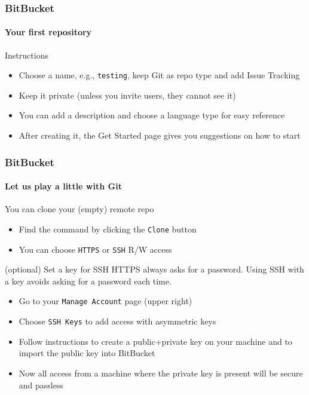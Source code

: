 \begin{frame}
\frametitle{BitBucket}
\framesubtitle{Your first repository}

\begin{block}{Instructions}
\begin{itemize}
\item Choose a name, e.g., \texttt{testing}, keep Git as repo type and add Issue Tracking
\item Keep it private (unless you invite users, they cannot see it)
\item You can add a description and choose a language type for easy reference
\item After creating it, the Get Started page gives you suggestions on how to start
\end{itemize}
\end{block}

\end{frame}

\begin{frame}
\frametitle{BitBucket}
\framesubtitle{Let us play a little with Git}

\begin{block}{You can clone your (empty) remote repo}
\begin{itemize}
\item Find the command by clicking the \texttt{Clone} button
\item You can choose \texttt{HTTPS} or \texttt{SSH} R/W access
\end{itemize}
\end{block}

\begin{block}{(optional) Set a key for SSH}
HTTPS always asks for a password. Using SSH with a key avoids asking for a password each time. 
\begin{itemize}
\item Go to your \texttt{Manage Account} page (upper right)
\item Choose \texttt{SSH Keys} to add access with asymmetric keys
\item Follow instructions to create a public+private key on your machine and to import the public key into BitBucket
\item Now all access from a machine where the private key is present will be secure and passless
\end{itemize}
\end{block}

\end{frame}


